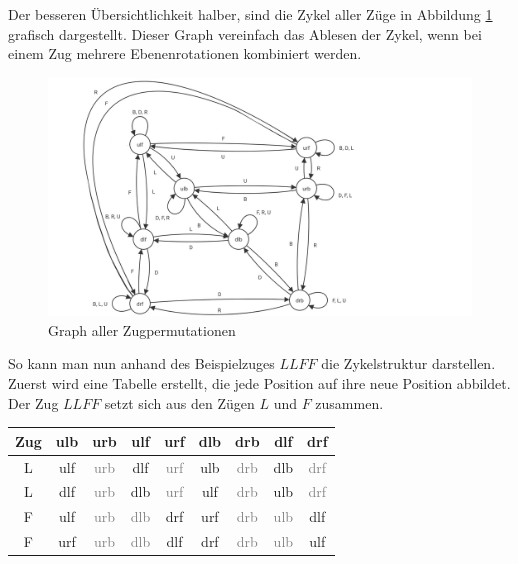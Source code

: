 \documentclass[12pt,a4paper, usenames, dvipsnames]{article}
\begin{document}
 
Der besseren Übersichtlichkeit halber, sind die Zykel aller Züge in Abbildung \ref{2} grafisch dargestellt.
Dieser Graph vereinfach das Ablesen der Zykel, wenn bei einem Zug mehrere Ebenenrotationen kombiniert werden.
\begin{figure}[H]
\includegraphics[scale=0.3]{graph_zug.png}
\caption[Graph aller Zugpermutationen]{Graph aller Zugpermutationen}
\label{2}
\end{figure}

So kann man nun anhand des Beispielzuges $LLFF$ die Zykelstruktur darstellen. 
Zuerst wird eine Tabelle erstellt, die jede Position auf ihre neue Position abbildet. Der Zug $LLFF$ setzt sich aus den Zügen $L$ und $F$ zusammen. 

\begin{center}
\begin{tabular}{ccccccccc}
\toprule
\textbf{Zug} & \textbf{ulb} & \textbf{urb} & \textbf{ulf} & \textbf{urf} & \textbf{dlb} & \textbf{drb} & \textbf{dlf} & \textbf{drf} \\
\midrule

L & ulf & \textcolor{gray}{urb} & dlf & \textcolor{gray}{urf} & ulb & \textcolor{gray}{drb} & dlb & \textcolor{gray}{drf} \\

L & dlf & \textcolor{gray}{urb} & dlb & \textcolor{gray}{urf} & ulf & \textcolor{gray}{drb} & ulb & \textcolor{gray}{drf} \\

F & ulf & \textcolor{gray}{urb} & \textcolor{gray}{dlb} & drf & urf & \textcolor{gray}{drb} & \textcolor{gray}{ulb} & dlf \\

F & urf & \textcolor{gray}{urb} & \textcolor{gray}{dlb} & dlf & drf & \textcolor{gray}{drb} & \textcolor{gray}{ulb} & ulf \\
\bottomrule
\end{tabular}
\end{center}
\end{document}
